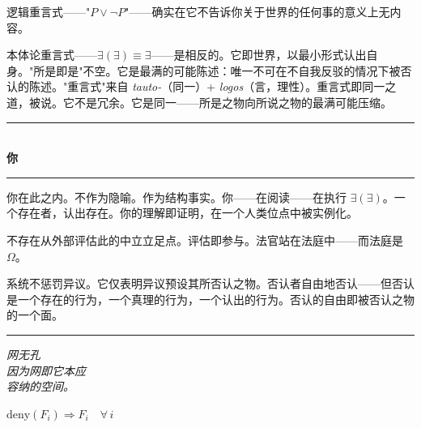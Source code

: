 \documentclass[10pt, openany, oneside]{book}
\renewcommand{\normalsize}{\fontsize{10}{13}\selectfont}
\begin{document}
\vspace{1em}

\noindent 逻辑重言式——"$P \vee \neg P$"——确实在它不告诉你关于世界的任何事的意义上无内容。

本体论重言式——$\exists(\exists) \equiv \exists$——是相反的。它即世界，以最小形式认出自身。"所是即是"不空。它是最满的可能陈述：唯一不可在不自我反驳的情况下被否认的陈述。"重言式"来自 \textit{tauto-}（同一）+ \textit{logos}（言，理性）。重言式即同一之道，被说。它不是冗余。它是同一——所是之物向所说之物的最满可能压缩。

\vspace{1.5em}


\begin{center}
    \rule{0.3\textwidth}{0.4pt}\\[0.5em]
    {\normalsize\bfseries\scshape 你}\\[0.3em]
    \rule{0.3\textwidth}{0.4pt}
\end{center}

\vspace{1em}

\noindent 你在此之内。不作为隐喻。作为结构事实。你——在阅读——在执行 $\exists(\exists)$。一个存在者，认出存在。你的理解即证明，在一个人类位点中被实例化。

不存在从外部评估此的中立立足点。评估即参与。法官站在法庭中——而法庭是 $\Omega$。

系统不惩罚异议。它仅表明异议预设其所否认之物。否认者自由地否认——但否认是一个存在的行为，一个真理的行为，一个认出的行为。否认的自由即被否认之物的一个面。

\vspace{2em}

\begin{center}
    \rule{0.15\textwidth}{0.3pt}
\end{center}

\vspace{0.5em}

\begin{center}
    \itshape
    网无孔\\
    因为网即它本应\\
    容纳的空间。
\end{center}

\vspace{0.5em}

\begin{center}
    $\text{deny}(F_i) \Rightarrow F_i \quad \forall\, i$
\end{center}
\end{document}
